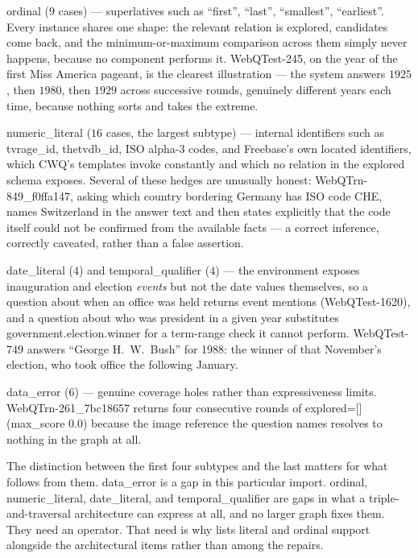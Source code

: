 \textsf{ordinal} ($9$ cases) --- superlatives such as ``first'', ``last'',
``smallest'', ``earliest''. Every instance shares one shape: the relevant
relation is explored, candidates come back, and the minimum-or-maximum
comparison across them simply never happens, because no component performs it.
\textsf{WebQTest-245}, on the year of the first Miss America pageant, is the
clearest illustration --- the system answers $1925$, then $1980$, then $1929$
across successive rounds, genuinely different years each time, because nothing
sorts and takes the extreme.

\textsf{numeric\_literal} ($16$ cases, the largest subtype) --- internal
identifiers such as \textsf{tvrage\_id}, \textsf{thetvdb\_id}, ISO alpha-3
codes, and Freebase's own located identifiers, which CWQ's templates invoke
constantly and which no relation in the explored schema exposes. Several of
these hedges are unusually honest: \textsf{WebQTrn-849\_f0ffa147}, asking which
country bordering Germany has ISO code CHE, names Switzerland in the answer text
and then states explicitly that the code itself could not be confirmed from the
available facts --- a correct inference, correctly caveated, rather than a false
assertion.

\textsf{date\_literal} ($4$) and \textsf{temporal\_qualifier} ($4$) --- the
environment exposes inauguration and election \emph{events} but not the date
values themselves, so a question about when an office was held returns event
mentions (\textsf{WebQTest-1620}), and a question about who was president in a
given year substitutes \textsf{government.election.winner} for a term-range
check it cannot perform. \textsf{WebQTest-749} answers ``George H.~W.~Bush'' for
1988: the winner of that November's election, who took office the following
January.

\textsf{data\_error} ($6$) --- genuine coverage holes rather than expressiveness
limits. \textsf{WebQTrn-261\_7bc18657} returns four consecutive rounds of
\textsf{explored=[] (max\_score 0.0)} because the image reference the question
names resolves to nothing in the graph at all.

The distinction between the first four subtypes and the last matters for what
follows from them. \textsf{data\_error} is a gap in this particular import.
\textsf{ordinal}, \textsf{numeric\_literal}, \textsf{date\_literal}, and
\textsf{temporal\_qualifier} are gaps in what a triple-and-traversal
architecture can express at all, and no larger graph fixes them. They need an
operator. That need is why  lists literal and ordinal support
alongside the architectural items rather than among the repairs.


